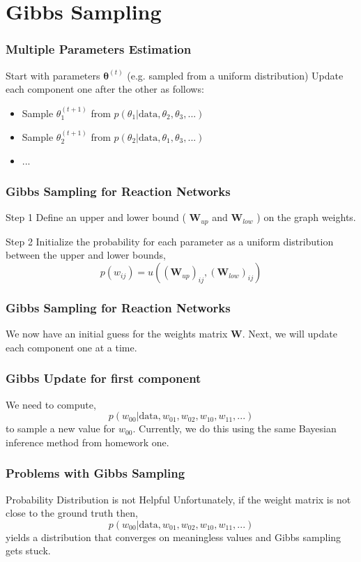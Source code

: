\documentclass{beamer}
\begin{document}
\section{Gibbs Sampling}

\begin{frame}
\frametitle{Multiple Parameters Estimation}
Start with parameters $\bm{\theta}^{\left( t\right)}$ (e.g. sampled from a uniform distribution)
Update each component one after the other as follows:
\begin{itemize}
\item Sample $\theta^{\left( t + 1 \right)}_{1}$ from $p \left( \theta_{1} | \text{data}, \theta_{2}, \theta_{3}, ... \right)$
\item Sample $\theta^{\left( t+1 \right)}_{2}$ from $p \left( \theta_{2} | \text{data}, \theta_{1}, \theta_{3}, ... \right)$
\item ...
\end{itemize}
\end{frame}

\begin{frame}
\frametitle{Gibbs Sampling for Reaction Networks}

\begin{block}{Step 1}
Define an upper and lower bound ( $\bm{W}_{up}$ and $\bm{W}_{low}$ ) on the graph weights.
\end{block}

\begin{block}{Step 2}
Initialize the probability for each parameter as a uniform distribution between the upper and lower bounds,
\[
p\left(w_{ij}\right)=u\left(\left( \bm{W}_{up} \right)_{ij}, \left( \bm{W}_{low} \right)_{ij} \right)
\]
\end{block}

\end{frame}

\begin{frame}
\frametitle{Gibbs Sampling for Reaction Networks}

We now have an initial guess for the weights matrix $\bm{W}$. Next, we will update each component one at a time.

\end{frame}

\begin{frame}
\frametitle{Gibbs Update for first component}
We need to compute,
\[
p\left(w_{00}|\text{data},w_{01},w_{02},w_{10},w_{11},...\right)
\]
to sample a new value for $w_{00}$. Currently, we do this using the same Bayesian inference method from homework one.
\end{frame}

\begin{frame}
\frametitle{Problems with Gibbs Sampling}
\begin{block}{Probability Distribution is not Helpful}
Unfortunately, if the weight matrix is not close to the ground truth then,
\[
p\left(w_{00}|\text{data},w_{01},w_{02},w_{10},w_{11},...\right)
\]
yields a distribution that converges on meaningless values and Gibbs sampling gets stuck.
\end{block}
\end{frame}
\end{document}
